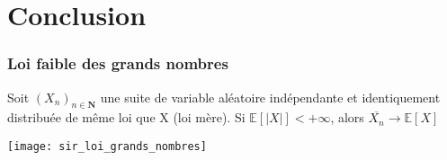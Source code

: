 \section{Conclusion}
\begin{frame}
	\frametitle{Loi faible des grands nombres}
	 Soit $(X_n)_{n \in \boldsymbol{N}}$ une suite de variable aléatoire indépendante et identiquement distribuée de même loi que X (loi mère). Si $\mathbb{E}[|X|] < +\infty$, alors $\overline{X_n} \rightarrow \mathbb{E}[X]$
\end{frame}

\begin{frame}
    \centering
    \texttt{[image: sir\_loi\_grands\_nombres]}
\end{frame}
